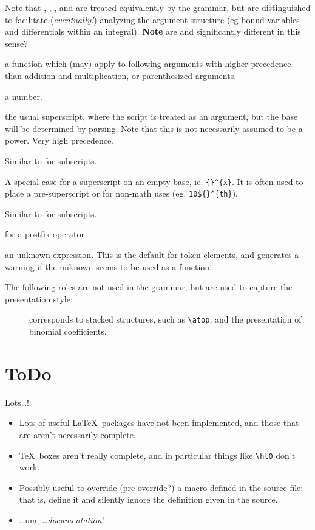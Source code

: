 \documentclass{book}
\begin{document}
\begin{description}
 Note that , , ,  and  are treated
 equivalently by the grammar, but are distinguished to facilitate (\emph{eventually!}) 
 analyzing the argument structure (eg bound variables and differentials within an integral).
 \textbf{Note} are  and  significantly different in this sense?
\item[\code{VERTBAR}]
\item[\code{FUNCTION}] a function which (may) apply to following arguments with higher
   precedence than addition and multiplication, or parenthesized arguments.
\item[\code{NUMBER}] a number.
\item[\code{POSTSUPERSCRIPT}] the usual superscript, where the script is treated as
  an argument, but the base will be determined by parsing. Note that this is not
  necessarily assumed to be a power. Very high precedence.
\item[\code{POSTSUBSCRIPT}] Similar to  for subscripts.
\item[\code{FLOATINGSUPERSCRIPT}] A special case for a superscript on an empty base,
  ie. \verb|{}^{x}|.  It is often used to place a pre-superscript or for
  non-math uses (eg. \verb|10${}^{th}|).
\item[\code{FLOATINGSUBSCRIPT}] Similar to  for subscripts.
\item[\code{POSTFIX}] for a postfix operator
\item[\code{UNKNOWN}] an unknown expression. This is the default for token elements,
  and generates a warning if the unknown seems to be used as a function.
\end{description}

The following roles are not used in the grammar, but are used to capture
the presentation style:
\begin{description}
\item[] corresponds to stacked structures, such as
  \verb|\atop|, and the presentation of binomial coefficients.
\end{description}

\chapter{ToDo}\label{todo}
Lots\ldots!
\begin{itemize}
\item Lots of useful \LaTeX\ packages have not been implemented, and those
  that are aren't necessarily complete.
\item \TeX\ boxes aren't really complete, and in particular things like \verb|\ht0|
  don't work.
\item Possibly useful to override (pre-override?) a macro defined in the source file;
  that is, define it and silently ignore the definition given in the source.
\item \ldots um, \ldots \emph{documentation}!
\end{itemize}
\end{document}

